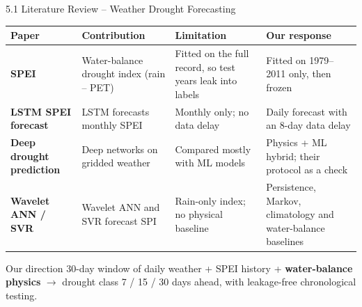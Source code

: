 \documentclass[aspectratio=169,10pt]{beamer}
\begin{document}
\begin{frame}{5.1 Literature Review -- Weather Drought Forecasting}
\vspace{1mm}
\footnotesize
\renewcommand{\arraystretch}{1.45}\setlength{\tabcolsep}{5pt}
\begin{tabularx}{\textwidth}{|>{\raggedright\arraybackslash}p{3.2cm}|Y|Y|Y|}
\hline
\textbf{Paper} & \textbf{Contribution} & \textbf{Limitation} & \textbf{Our response} \\ \hline
\textbf{SPEI}  & Water-balance drought index (rain -- PET) & Fitted on the full record, so test years leak into labels & Fitted on 1979--2011 only, then frozen \\ \hline
\textbf{LSTM SPEI forecast}  & LSTM forecasts monthly SPEI & Monthly only; no data delay & Daily forecast with an 8-day data delay \\ \hline
\textbf{Deep drought prediction}  & Deep networks on gridded weather & Compared mostly with ML models & Physics + ML hybrid; their protocol as a check \\ \hline
\textbf{Wavelet ANN / SVR}  & Wavelet ANN and SVR forecast SPI & Rain-only index; no physical baseline & Persistence, Markov, climatology and water-balance baselines \\ \hline
\end{tabularx}
\vspace{3mm}
\begin{card}{Our direction}
\footnotesize 30-day window of daily weather + SPEI history + \textbf{water-balance physics} $\rightarrow$ drought class 7 / 15 / 30 days ahead, with leakage-free chronological testing.
\end{card}
\end{frame}
\end{document}
